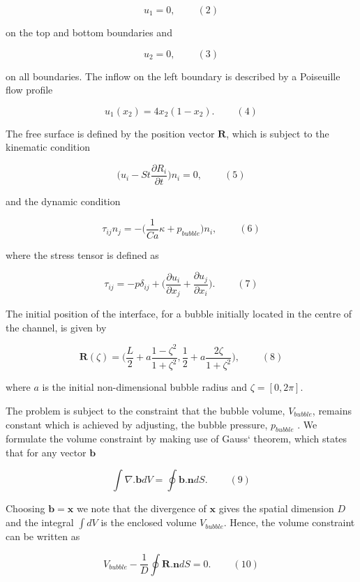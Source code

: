 \[ u_1=0, \ \ \ \ \ \ \ \ \ \ (2) \]

on the top and bottom boundaries and

\[ u_2=0, \ \ \ \ \ \ \ \ \ \ (3) \]

on all boundaries. The inflow on the left boundary is described by a Poiseuille flow profile

\[ u_1(x_2)=4 x_2 (1-x_2). \ \ \ \ \ \ \ \ \ \ (4) \]

The free surface is defined by the position vector $ \mathbf{R} $, which is subject to the kinematic condition

\[ \Big(u_i-St \frac{\partial R_i}{\partial t} \Big) n_i =0, \ \ \ \ \ \ \ \ \ \ (5) \]

and the dynamic condition

\[ \tau_{ij} n_j=- \Big( \frac{1}{Ca} \kappa+p_{bubble} \Big) n_i, \ \ \ \ \ \ \ \ \ \ (6) \]

where the stress tensor is defined as

\[ \tau_{ij}=-p \delta_{ij}+\Big( \frac{\partial u_i}{\partial x_j} + \frac{\partial u_j}{\partial x_i} \Big). \ \ \ \ \ \ \ \ \ \ (7) \]

The initial position of the interface, for a bubble initially located in the centre of the channel, is given by

\[ \mathbf{R}(\zeta)=\Big( \frac{L}{2}+ a \frac{1-\zeta^2}{1+\zeta^2}, \frac{1}{2} + a \frac{2\zeta}{1+\zeta^2} \Big), \ \ \ \ \ \ \ \ \ \ (8) \]

where $ a $ is the initial non-\/dimensional bubble radius and $ \zeta=[0,2\pi] $.





The problem is subject to the constraint that the bubble volume, $ V_{bubble} $, remains constant which is achieved by adjusting, the bubble pressure, $ p_{bubble} $ . We formulate the volume constraint by making use of Gauss` theorem, which states that for any vector $ \mathbf{b} $

\[ \int \nabla . \mathbf{b} dV = \oint \mathbf{b}. \mathbf{n} dS. \ \ \ \ \ \ \ \ \ \ (9) \]

Choosing $ \mathbf{b}=\mathbf{x} $ we note that the divergence of $\mathbf{x}$ gives the spatial dimension $ D $ and the integral $\int dV$ is the enclosed volume $V_{bubble}$. Hence, the volume constraint can be written as

\[ V_{bubble}-\frac{1}{D} \oint \mathbf{R}.\mathbf{n} dS=0. \ \ \ \ \ \ \ \ \ \ (10) \]

